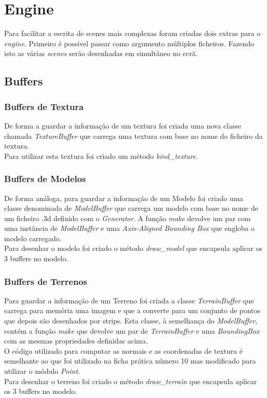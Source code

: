 \documentclass[a4paper]{report}
\begin{document}
\chapter{Engine}
Para facilitar a escrita de scenes mais complexas foram criadas dois extras para
o \textit{engine}. Primeiro é possível passar como argumento múltiplos
ficheiros. Fazendo isto as várias \textit{scenes} serão desenhadas em simultâneo
no ecrã.\\

\section{Buffers}
\subsection{Buffers de Textura}
De forma a guardar a informação de um textura foi criada uma nova classe
chamada \textit{TextureBuffer} que carrega uma textura com base no nome do
ficheiro da textura.\\
Para utilizar esta textura foi criado um método \textit{bind\_texture}.

\subsection{Buffers de Modelos}
De forma análoga, para guardar a informação de um Modelo foi criado uma classe
denominada de \textit{ModelBuffer} que carrega um modelo com base no nome de um
ficheiro .3d definido com o \textit{Generator}. A função \textit{make} devolve
um par com uma instância de \textit{ModelBuffer} e uma \textit{Axis-Aligned
Bounding Box} que engloba o modelo carregado.\\
Para desenhar o modelo foi criado o método \textit{draw\_model} que encapsula
aplicar os 3 buffers no modelo.\\

\subsection{Buffers de Terrenos}
Para guardar a informação de um Terreno foi criada a classe
\textit{TerrainBuffer} que carrega para memória uma imagem e que a converte para
um conjunto de pontos que depois são desenhados por strips. Esta classe, à
semelhança do \textit{ModelBuffer}, contém a função \textit{make} que devolve um
par de \textit{TerrainBuffer} e uma \textit{BoundingBox} com as mesmas
propriedades definidas acima.\\
O código utilizado para computar as normais e as coordenadas de textura é
semelhante ao que foi utilizado na ficha prática número 10 mas modificado para
utilizar o módulo \textit{Point}.\\
Para desenhar o terreno foi criado o método \textit{draw\_terrain} que encapsula
aplicar os 3 buffers no modelo.\\
\end{document}
